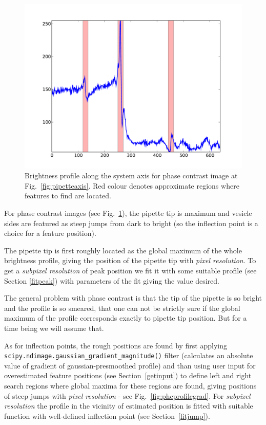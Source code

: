 \begin{figure}%
\includegraphics[width=\columnwidth]{figs/phcaxisprofile.pdf}%
\caption{Brightness profile along the system axis for phase contrast image at Fig.~\ref{fig:pipetteaxis}. Red colour denotes approximate regions where features to find are located.}%
\label{fig:phcaxisprofile}%
\end{figure}

For phase contrast images (see Fig.~\ref{fig:phcaxisprofile}), the pipette tip is maximum and vesicle sides are featured as steep jumps from dark to bright (so the inflection point is a choice for a feature position). 

The pipette tip is first roughly located as the global maximum of the whole brightness profile, giving the position of the pipette tip with \emph{pixel resolution}. To get a \emph{subpixel resolution} of peak position we fit it with some suitable profile (see Section \ref{fitpeak}) with parameters of the fit giving the value desired.

The general problem with phase contrast is that the tip of the pipette is so bright and the profile is so smeared, that one can not be strictly sure if the global maximum of the profile corresponds exactly to pipette tip position. But for a time being we will assume that.

As for inflection points, the rough positions are found by first applying \verb|scipy.ndimage.gaussian_gradient_magnitude()| filter (calculates an absolute value of gradient of gaussian-presmoothed profile) and than using user input for overestimated feature positions (see Section~\ref{getinput}) to define left and right search regions where global maxima for these regions are found, giving positions of steep jumps with \emph{pixel resolution} - see Fig.~\ref{fig:phcprofilegrad}. For \emph{subpixel resolution} the profile in the vicinity of estimated position is fitted with suitable function with well-defined inflection point (see Section~\ref{fitjump}).

